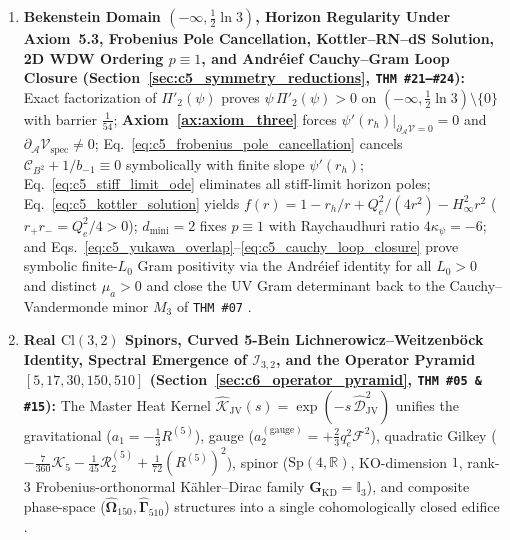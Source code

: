 \documentclass[11pt,a4paper]{article}
\newcommand{\catD}{\text{\textbf{\textcolor{blue!75!black}{[D]}}}}
\theoremstyle{definition}
\theoremstyle{plain}
\theoremstyle{remark}
\begin{document}
\begin{enumerate}[label=\arabic*.]
  \item \textbf{Bekenstein Domain $(-\infty, \frac{1}{2}\ln 3)$, Horizon Regularity Under Axiom~5.3, Frobenius Pole Cancellation, Kottler--RN--dS Solution, 2D WDW Ordering $p \equiv 1$, and Andr\'eief Cauchy--Gram Loop Closure (Section~\ref{sec:c5_symmetry_reductions}, \texttt{THM~\#21--\#24}):} Exact factorization of $\Pi'_2(\psi)$ proves $\psi\,\Pi'_2(\psi)>0$ on $(-\infty, \frac{1}{2}\ln 3)\setminus\{0\}$ with barrier $\frac{1}{54}$; \textbf{Axiom~\ref{ax:axiom_three}} forces $\left.\psi'(r_h)\right|_{\partial_{\mathcal{A}}\mathcal{V}=0}=0$ and $\partial_{\mathcal{A}}\mathcal{V}_{\mathrm{spec}} \neq 0$; Eq.~\eqref{eq:c5_frobenius_pole_cancellation} cancels $\mathcal{C}_{B^2} + 1/b_{-1} \equiv 0$ symbolically with finite slope $\psi'(r_h)$; Eq.~\eqref{eq:c5_stiff_limit_ode} eliminates all stiff-limit horizon poles; Eq.~\eqref{eq:c5_kottler_solution} yields $f(r) = 1 - r_h/r + Q_e^2/(4r^2) - H_\infty^2 r^2$ ($r_+ r_- = Q_e^2/4 > 0$); $d_{\mathrm{mini}} = 2$ fixes $p \equiv 1$ with Raychaudhuri ratio $4\kappa_\psi=-6$; and Eqs.~\eqref{eq:c5_yukawa_overlap}--\eqref{eq:c5_cauchy_loop_closure} prove symbolic finite-$L_0$ Gram positivity via the Andr\'eief identity for all $L_0 > 0$ and distinct $\mu_a > 0$ and close the UV Gram determinant back to the Cauchy--Vandermonde minor $M_3$ of \texttt{THM~\#07} \catD.
  \item \textbf{Real $\mathrm{Cl}(3,2)$ Spinors, Curved 5-Bein Lichnerowicz--Weitzenb\"ock Identity, Spectral Emergence of $\mathcal{I}_{3,2}$, and the Operator Pyramid $[5, 17, 30, 150, 510]$ (Section~\ref{sec:c6_operator_pyramid}, \texttt{THM~\#05 \& \#15}):} The Master Heat Kernel $\widehat{\mathcal{K}}_{\mathrm{JV}}(s) = \exp(-s\,\widehat{\mathcal{D}}_{\mathrm{JV}}^2)$ unifies the gravitational ($a_1 = -\frac{1}{3}R^{(5)}$), gauge ($a_2^{(\mathrm{gauge})} = +\frac{2}{3}q_e^2\mathcal{F}^2$), quadratic Gilkey ($-\frac{7}{360}\mathcal{K}_5 - \frac{1}{45}\mathcal{R}_2^{(5)} + \frac{1}{72}(R^{(5)})^2$), spinor ($\mathrm{Sp}(4,\mathbb{R})$, KO-dimension $1$, rank-3 Frobenius-orthonormal K\"ahler--Dirac family $\mathbf{G}_{\mathrm{KD}} = \mathbb{I}_3$), and composite phase-space ($\widehat{\mathbf{\Omega}}_{150}, \widehat{\mathbf{\Gamma}}_{510}$) structures into a single cohomologically closed edifice \catD.
\end{enumerate}
\end{document}
